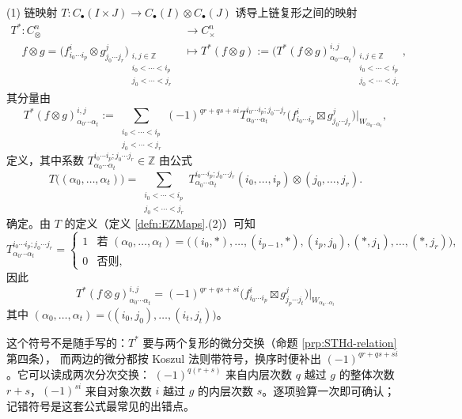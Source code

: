 \begin{dfn}
(1) 链映射
$
T:
C_{\bullet}(I\times J)
\rightarrow
C_{\bullet}(I)\otimes C_{\bullet}(J)
$
诱导上链复形之间的映射
\begin{align*}
T^*:
C_{\otimes}^n
&\rightarrow
C_{\times}^n
\\
\quad
f\otimes g
=
\Big(
f_{i_0\cdots i_p}^i
\otimes
g_{j_0\cdots j_r}^j
\Big)
_{\substack{
i,j\in\mathbb{Z}
\\
i_0<\cdots<i_p
\\
j_0<\cdots<j_r
}}
&\mapsto
T^*(f\otimes g)
:=
\Big(
T^*(f\otimes g)_{\alpha_0\cdots\alpha_t}^{i,j}
\Big)
_{\substack{
i,j\in\mathbb{Z}
\\
i_0<\cdots<i_p
\\
j_0<\cdots<j_r
}},
\end{align*}
其分量由
$$
T^*(f\otimes g)_{\alpha_0\cdots\alpha_t}^{i,j}
:=
\sum_{\substack{
i_0<\cdots<i_p
\\
j_0<\cdots<j_r
}}
(-1)^{qr+qs+si}
T_{\alpha_0\cdots\alpha_t}^{i_0\cdots i_p;j_0\cdots j_r}
\big(
f_{i_0\cdots i_p}^i
\boxtimes
g_{j_0\cdots j_r}^j
\big)\big|_{W_{\alpha_0\cdots\alpha_t}},
$$
定义，其中系数
$
T_{\alpha_0\cdots\alpha_t}^{i_0\cdots i_p;j_0\cdots j_r}
\in\mathbb{Z}
$
由公式
$$
T\big((\alpha_0,\dots,\alpha_t)\big)
=
\sum_{\substack{
i_0<\cdots<i_p
\\
j_0<\cdots<j_r
}}
T_{\alpha_0\cdots\alpha_t}^{i_0\cdots i_p;j_0\cdots j_r}
(i_0,\dots,i_p)\otimes(j_0,\dots,j_r).
$$
确定。由 $T$ 的定义（定义 \ref{defn:EZMaps}.(2)）可知
$$
T_{\alpha_0\cdots\alpha_t}^{i_0\cdots i_p;j_0\cdots j_r}
=
\begin{cases}
1
&
\text{若 }
(\alpha_0,\dots,\alpha_t)
=
\big((i_0,*),\dots,(i_{p-1},*),(i_p,j_0),(*,j_1),\dots,(*,j_r)\big),
\\
0
&
\text{否则},
\end{cases}
$$
因此
$$
T^*(f\otimes g)_{\alpha_0\cdots\alpha_t}^{i,j}
=
(-1)^{qr+qs+si}
\big(
f_{i_0\cdots i_p}^i
\boxtimes
g_{j_p\cdots j_t}^j
\big)\big|_{W_{\alpha_0\cdots\alpha_t}}
$$
其中 $(\alpha_0,\dots,\alpha_t)=\big((i_0,j_0),\dots,(i_t,j_t)\big)$。

\begin{yizhu}[符号 $(-1)^{qr+qs+si}$ 怎么读]
这个符号不是随手写的：$T^{\ast}$ 要与两个复形的微分交换（命题 \ref{prp:STHd-relation} 第四条），
而两边的微分都按 Koszul 法则带符号，换序时便补出 $(-1)^{qr+qs+si}$。它可以读成两次分次交换：
$(-1)^{q(r+s)}$ 来自内层次数 $q$ 越过 $g$ 的整体次数 $r+s$，$(-1)^{si}$ 来自对象次数 $i$ 越过
$g$ 的内层次数 $s$。逐项验算一次即可确认；记错符号是这套公式最常见的出错点。
\end{yizhu}


\end{dfn}
